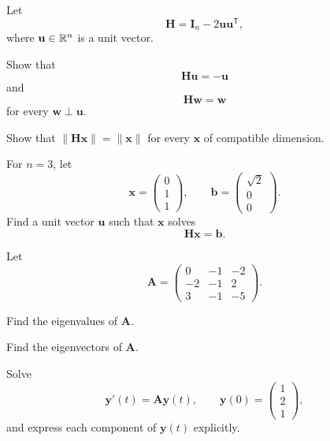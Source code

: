 \documentclass[11pt,oneside]{article}
\begin{document}
\begin{problem}
Let
\[
\mathbf H=\mathbf I_n-2\mathbf u\mathbf u^{\mathsf T},
\]
where $\mathbf u\in\mathbb{R}^n$ is a unit vector.
\begin{problemsubparts}
\item Show that
\[
\mathbf H\mathbf u=-\mathbf u
\]
and
\[
\mathbf H\mathbf w=\mathbf w
\]
for every $\mathbf w\perp\mathbf u$.
\item Show that $\|\mathbf H\mathbf x\|=\|\mathbf x\|$ for every $\mathbf x$ of compatible dimension.
\item For $n=3$, let
\[
\mathbf x=
\begin{pmatrix}0\\1\\1\end{pmatrix},
\qquad
\mathbf b=
\begin{pmatrix}\sqrt2\\0\\0\end{pmatrix}.
\]
Find a unit vector $\mathbf u$ such that $\mathbf x$ solves
\[
\mathbf H\mathbf x=\mathbf b.
\]
\end{problemsubparts}
\end{problem}

\begin{problem}
Let
\[
\mathbf A=
\begin{pmatrix}
0&-1&-2\\
-2&-1&2\\
3&-1&-5
\end{pmatrix}.
\]
\begin{problemsubparts}
\item Find the eigenvalues of $\mathbf A$.
\item Find the eigenvectors of $\mathbf A$.
\item Solve
\[
\mathbf y'(t)=\mathbf A\mathbf y(t),
\qquad
\mathbf y(0)=
\begin{pmatrix}
1\\2\\1
\end{pmatrix},
\]
and express each component of $\mathbf y(t)$ explicitly.
\end{problemsubparts}
\end{problem}
\end{document}
